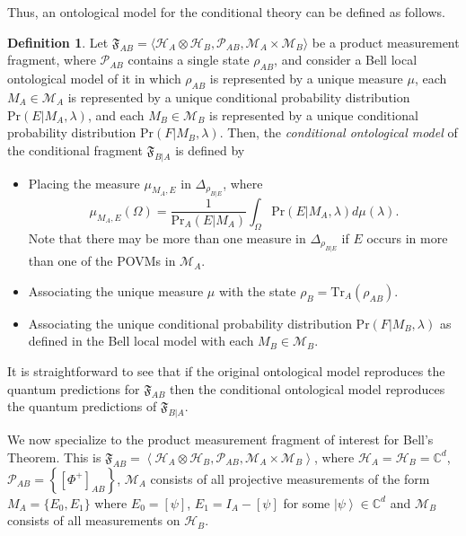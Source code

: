 \documentclass[DIV=calc,fontsize=12pt]{scrartcl} %
\theoremstyle{definition}
\newtheorem{definition}{Definition}[section]
\theoremstyle{plain}
\newcommand{\Ket}[1]{\ensuremath{\left \vert #1 \right \rangle}}
\newcommand{\Proj}[1]{\ensuremath{\left [ #1 \right ]}}
\newcommand{\Hilb}[1][]{\ensuremath{\mathcal{H}_{#1}}}
\newcommand{\Tr}[2][]{\ensuremath{\text{Tr}_{#1} \left ( #2 \right )}}
\begin{document}
Thus, an ontological model for the conditional theory can be defined
as follows.
\begin{definition}
\label{def:Bell:cond}
Let $\mathfrak{F}_{AB} = \langle \Hilb[A] \otimes \Hilb[B],
\mathcal{P}_{AB}, \mathcal{M}_A \times \mathcal{M}_B \rangle$ be a
product measurement fragment, where $\mathcal{P}_{AB}$ contains a
single state $\rho_{AB}$, and consider a Bell local ontological
model of it in which $\rho_{AB}$ is represented by a unique measure
$\mu$, each $M_A \in \mathcal{M}_A$ is represented by a unique
conditional probability distribution $\text{Pr}(E|M_A,\lambda)$, and
each $M_B \in \mathcal{M}_B$ is represented by a unique conditional
probability distribution $\text{Pr}(F|M_B,\lambda)$.  Then, the
\emph{conditional ontological model} of the conditional fragment
$\mathfrak{F}_{B|A}$ is defined by
\begin{itemize}
\item Placing the measure $\mu_{M_A,E}$ in $\Delta_{\rho_{B|E}}$,
where
\begin{equation}
\mu_{M_A,E}(\Omega) = \frac{1}{\text{Pr}_A(E|M_A)}\int_{\Omega}
\text{Pr}(E|M_A,\lambda) d\mu(\lambda).
\end{equation}
Note that there may be more than one measure in
$\Delta_{\rho_{B|E}}$ if $E$ occurs in more than one of the POVMs
in $\mathcal{M}_A$.
\item Associating the unique measure $\mu$ with the state $\rho_B =
\Tr[A]{\rho_{AB}}$.
\item Associating the unique conditional probability distribution
$\text{Pr}(F|M_B,\lambda)$ as defined in the Bell local model
with each $M_B \in \mathcal{M}_B$.
\end{itemize}
\end{definition}
It is straightforward to see that if the original ontological model
reproduces the quantum predictions for $\mathfrak{F}_{AB}$ then the
conditional ontological model reproduces the quantum predictions of
$\mathfrak{F}_{B|A}$.

We now specialize to the product measurement fragment of interest for
Bell's Theorem.  This is $\mathfrak{F}_{AB} = \left \langle \Hilb[A]
\otimes \Hilb[B], \mathcal{P}_{AB}, \mathcal{M}_A \times
\mathcal{M}_B \right \rangle$, where $\Hilb[A] = \Hilb[B] =
\mathbb{C}^d$, $\mathcal{P}_{AB} = \left \{ \Proj{\Phi^+}_{AB} \right
\}$, $\mathcal{M}_A$ consists of all projective measurements of the
form $M_A = \{E_0,E_1\}$ where $E_0 = \Proj{\psi}$, $E_1 = I_A -
\Proj{\psi}$ for some $\Ket{\psi} \in \mathbb{C}^d$ and
$\mathcal{M}_B$ consists of all measurements on $\Hilb[B]$.
\end{document}
